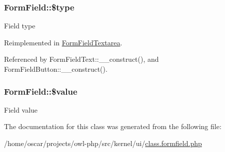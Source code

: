 \subsubsection[{\$type}]{\setlength{\rightskip}{0pt plus 5cm}FormField::\$type}\label{classFormField_a37bed21a1891e95be0e4a697e45ba51b}
Field type 

Reimplemented in \hyperlink{classFormFieldTextarea_a85348034822c70694fc8640bfcacc04d}{FormFieldTextarea}.



Referenced by FormFieldText::\_\-\_\-construct(), and FormFieldButton::\_\-\_\-construct().

\subsubsection[{\$value}]{\setlength{\rightskip}{0pt plus 5cm}FormField::\$value}\label{classFormField_a3c01e89834248eec8e2f145fbcfa0fbc}
Field value 

The documentation for this class was generated from the following file:\begin{DoxyCompactItemize}
\item 
/home/oscar/projects/owl-\/php/src/kernel/ui/\hyperlink{class_8formfield_8php}{class.formfield.php}\end{DoxyCompactItemize}
